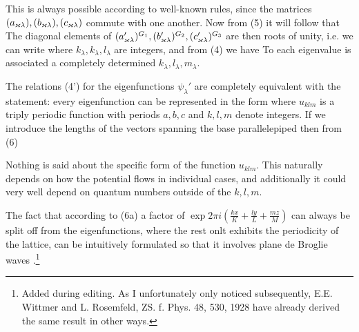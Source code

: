 \begin{paper}{1}
This is always possible according to well-known rules, since the matrices $(a_{\varkappa\lambda}), (b_{\varkappa\lambda}), (c_{\varkappa\lambda})$ commute with one another. Now from (5) it will follow that
The diagonal elements of $(a_{\varkappa\lambda}')^{G_1}, (b_{\varkappa\lambda}')^{G_2}, (c_{\varkappa\lambda}')^{G_3}$ are then roots of unity, i.e. we can write
where $k_\lambda,k_\lambda,l_\lambda$ are integers, and from (4) we have
To each eigenvalue is associated a completely determined  $k_\lambda,l_\lambda,m_\lambda$.

The relations (4') for the eigenfunctions $\psi_\lambda'$ are completely equivalent with the statement: every eigenfunction can be represented in the form
where $u_{klm}$ is a triply periodic function with periods $a,b,c$ and $k,l,m$ denote integers. If we introduce the lengths of the vectors spanning the base parallelepiped
then from (6)

Nothing is said about the specific form of the function $u_{klm}$. This naturally depends on how the potential flows in individual cases, and additionally it could very well depend on quantum numbers outside of the $k,l,m$.

The fact that according to (6a) a factor of $\exp{2\pi i\left(\frac{kx}{K}+\frac{ly}{L}+\frac{mz}{M}\right)}$ can always be split off from the eigenfunctions, where the rest onlt exhibits the periodicity of the lattice, can be intuitively formulated so that it involves plane de Broglie waves .\footnote{Added during editing. As I unfortunately only noticed subsequently, E.E. Wittmer and L. Rosemfeld, ZS. f. Phys. 48, 530, 1928 have already derived the same result in other ways.}


\end{paper}
